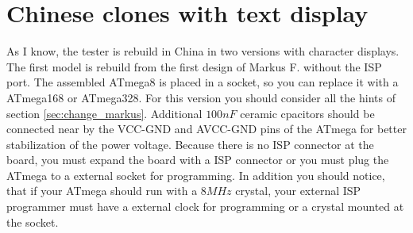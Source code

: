 \section{Chinese clones with text display}
As I know, the tester is rebuild in China in two versions with character displays.
The first model is rebuild from the first design of Markus F. without the ISP port.
The assembled ATmega8 is placed in a socket, so you can replace it with a ATmega168 or ATmega328.
For this version you should consider all the hints of section \ref{sec:change_markus}.
Additional \(100nF\) ceramic cpacitors should be connected near by the VCC-GND and AVCC-GND pins of
the ATmega for better stabilization of the power voltage.
Because there is no ISP connector at the board, you must expand the board with a ISP connector or you
must plug the ATmega to a external socket for programming.
In addition you should notice, that if your ATmega should run with a \(8MHz\) crystal,
your external ISP programmer must have a external clock for programming or a crystal mounted at the socket.\\

